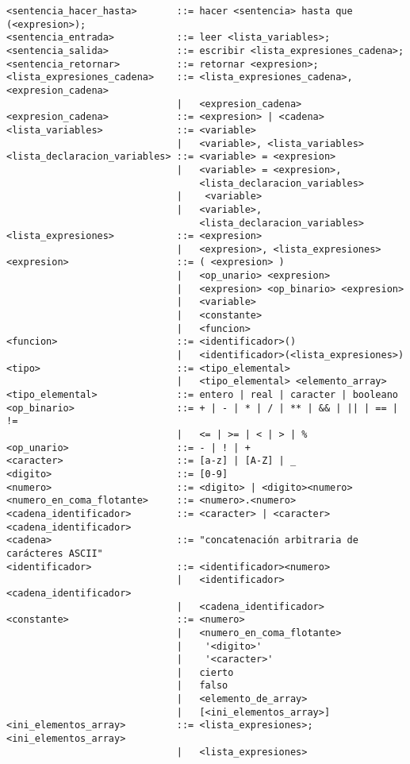 \begin{verbatim}
<sentencia_hacer_hasta>       ::= hacer <sentencia> hasta que (<expresion>);
<sentencia_entrada>           ::= leer <lista_variables>;
<sentencia_salida>            ::= escribir <lista_expresiones_cadena>;
<sentencia_retornar>          ::= retornar <expresion>;
<lista_expresiones_cadena>    ::= <lista_expresiones_cadena>, <expresion_cadena>
                              |   <expresion_cadena>
<expresion_cadena>            ::= <expresion> | <cadena>
<lista_variables>             ::= <variable>
                              |   <variable>, <lista_variables>
<lista_declaracion_variables> ::= <variable> = <expresion>
                              |   <variable> = <expresion>,
                                  <lista_declaracion_variables>
                              |    <variable>
                              |   <variable>,
                                  <lista_declaracion_variables>
<lista_expresiones>           ::= <expresion>
                              |   <expresion>, <lista_expresiones>
<expresion>                   ::= ( <expresion> )
                              |   <op_unario> <expresion>
                              |   <expresion> <op_binario> <expresion>
                              |   <variable>
                              |   <constante>
                              |   <funcion>
<funcion>                     ::= <identificador>()
                              |   <identificador>(<lista_expresiones>)
<tipo>                        ::= <tipo_elemental>
                              |   <tipo_elemental> <elemento_array>
<tipo_elemental>              ::= entero | real | caracter | booleano
<op_binario>                  ::= + | - | * | / | ** | && | || | == | !=
                              |   <= | >= | < | > | %
<op_unario>                   ::= - | ! | +
<caracter>                    ::= [a-z] | [A-Z] | _
<digito>                      ::= [0-9]
<numero>                      ::= <digito> | <digito><numero>
<numero_en_coma_flotante>     ::= <numero>.<numero>
<cadena_identificador>        ::= <caracter> | <caracter><cadena_identificador>
<cadena>                      ::= "concatenación arbitraria de carácteres ASCII"
<identificador>               ::= <identificador><numero>
                              |   <identificador><cadena_identificador>
                              |   <cadena_identificador>
<constante>                   ::= <numero>
                              |   <numero_en_coma_flotante>
                              |    '<digito>'
                              |    '<caracter>'
                              |   cierto
                              |   falso
                              |   <elemento_de_array>
                              |   [<ini_elementos_array>]
<ini_elementos_array>         ::= <lista_expresiones>; <ini_elementos_array>
                              |   <lista_expresiones>
\end{verbatim}


